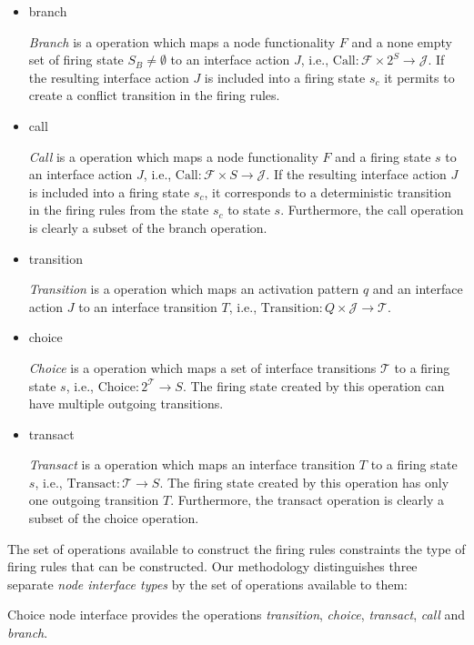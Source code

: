 \begin{itemize}
\item branch

\emph{Branch} is a operation which maps a node functionality $F$ and
a none empty set of firing state $S_{B} \ne \emptyset$ to an interface action $J$,
i.e., $\mathrm{Call}: \mathcal{F} \times 2^S \to \mathcal{J}$.
If the resulting interface action $J$ is included into a
firing state $s_{c}$ it permits to create a conflict transition
in the firing rules.
\item call

\emph{Call} is a operation which maps a node functionality $F$ and
a firing state $s$ to an interface action $J$,
i.e., $\mathrm{Call}: \mathcal{F} \times S \to \mathcal{J}$.
If the resulting interface action $J$ is included into a
firing state $s_{c}$, it corresponds to a deterministic transition
in the firing rules from the state $s_{c}$ to state $s$.
Furthermore, the call operation is clearly a subset of the
branch operation.

\item transition

\emph{Transition} is a operation which maps an activation pattern $q$ and
an interface action $J$ to an interface transition $T$,
i.e., $\mathrm{Transition}: Q \times \mathcal{J} \to \mathcal{T}$.

\item choice

\emph{Choice} is a operation which maps a set of interface transitions $\mathcal{T}$
to a firing state $s$,
i.e., $\mathrm{Choice}: 2^{\mathcal{T}} \to S$.
The firing state created by this operation can have multiple outgoing
transitions.

\item transact

\emph{Transact} is a operation which maps an interface transition $T$
to a firing state $s$,
i.e., $\mathrm{Transact}: \mathcal{T} \to S$.
The firing state created by this operation has only one outgoing
transition $T$. Furthermore, the transact operation is clearly a subset of the
choice operation.
\end{itemize}

The set of operations available to construct the firing rules constraints
the type of firing rules that can be constructed.
Our methodology distinguishes three separate \emph{node interface types}
by the set of operations available to them:

\begin{definition}\label{choice-node-interface-type}
Choice node interface provides the operations
\emph{transition}, \emph{choice}, \emph{transact}, \emph{call} and \emph{branch}.
\end{definition}

